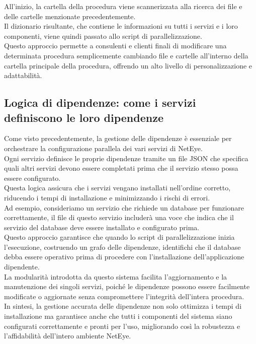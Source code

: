 All'inizio, la cartella della procedura viene scannerizzata alla ricerca dei
file e delle cartelle menzionate precedentemente.\\ Il dizionario risultante, che
contiene le informazioni su tutti i servizi e i loro componenti, viene quindi
passato allo script di parallelizzazione.\\ Questo approccio permette a
consulenti e clienti finali di modificare una determinata procedura
semplicemente cambiando file e cartelle all'interno della cartella principale
della procedura, offrendo un alto livello di personalizzazione e adattabilità.

\subsection{Logica di dipendenze: come i servizi definiscono le loro dipendenze}
\label{sub:dipendenze}

Come visto precedentemente, la gestione delle dipendenze è essenziale per orchestrare
la configurazione parallela dei vari servizi di NetEye.\\ Ogni servizio definisce
le proprie dipendenze tramite un file JSON che specifica quali altri servizi devono
essere completati prima che il servizio stesso possa essere configurato.\\ Questa
logica assicura che i servizi vengano installati nell'ordine corretto, riducendo
i tempi di installazione e minimizzando i rischi di errori.\\ Ad esempio, consideriamo
un servizio che richiede un database per funzionare correttamente, il file 
di questo servizio includerà una voce che indica che il servizio del database deve
essere installato e configurato prima.\\ Questo approccio garantisce che quando lo
script di parallelizzazione inizia l'esecuzione, costruendo un grafo delle
dipendenze, identifichi che il database debba essere operativo prima di procedere
con l'installazione dell'applicazione dipendente.\\ La modularità introdotta da questo
sistema facilita l'aggiornamento e la manutenzione dei singoli servizi, poiché
le dipendenze possono essere facilmente modificate o aggiornate senza
compromettere l'integrità dell'intera procedura.\\ In sintesi, la gestione accurata
delle dipendenze non solo ottimizza i tempi di installazione ma garantisce anche
che tutti i componenti del sistema siano configurati correttamente e pronti per l'uso,
migliorando così la robustezza e l'affidabilità dell'intero ambiente NetEye.


